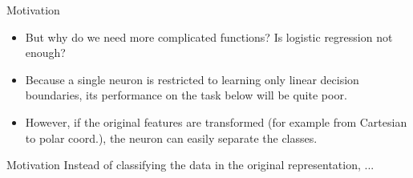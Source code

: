 \begin{frame} {Motivation}
  \begin{itemize}
    \item \small{But why do we need more complicated functions? Is logistic regression not enough?}
    \item \small{Because a single neuron is restricted to learning only linear decision boundaries, its performance on the task below will be quite poor. }
    \begin{figure}
    \centering
  \end{figure}
    \item \small{However, if the original features are transformed (for example from Cartesian to polar coord.), the neuron can easily separate the classes.}
    \begin{figure}
    \centering
  \end{figure}
  \end{itemize}
\end{frame}

\begin{frame} {Motivation}
  \small{Instead of classifying the data in the original representation, ...}
    \begin{figure}
    \centering
  \end{figure}
\end{frame}

